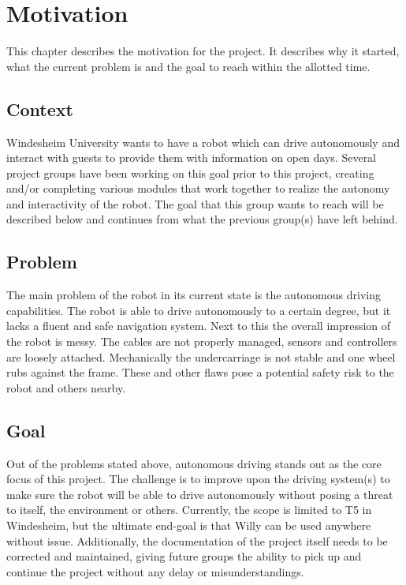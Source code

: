 \section{Motivation}
This chapter describes the motivation for the project. 
It describes why it started, what the current problem is and the goal to reach within the allotted time.

\subsection{Context}
Windesheim University wants to have a robot which can drive autonomously and interact with guests to provide them with information on open days.
Several project groups have been working on this goal prior to this project, creating and/or completing various modules that work together to realize the autonomy and interactivity of the robot.
The goal that this group wants to reach will be described below and continues from what the previous group(s) have left behind.

\subsection{Problem}
The main problem of the robot in its current state is the autonomous driving capabilities. 
The robot is able to drive autonomously to a certain degree, but it lacks a fluent and safe navigation system. 
Next to this the overall impression of the robot is messy. 
The cables are not properly managed, sensors and controllers are loosely attached. 
Mechanically the undercarriage is not stable and one wheel rubs against the frame. 
These and other flaws pose a potential safety risk to the robot and others nearby. 

\subsection{Goal}
Out of the problems stated above, autonomous driving stands out as the core focus of this project. 
The challenge is to improve upon the driving system(s) to make sure the robot will be able to drive autonomously without posing a threat to itself, the environment or others.
Currently, the scope is limited to T5 in Windesheim, but the ultimate end-goal is that Willy can be used anywhere without issue.
Additionally, the documentation of the project itself needs to be corrected and maintained, giving future groups the ability to pick up and continue the project without any delay or misunderstandings.


